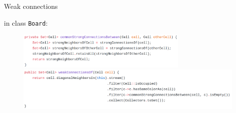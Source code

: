 \documentclass{beamer}
\begin{document}
\begin{frame}{Weak connections}

	in class \texttt{Board}:
\begin{figure}
	\includegraphics[width=0.74\textwidth]{images/board2.png}
	\includegraphics[width=1\textwidth]{images/board3.png}
\end{figure}

\end{frame}
\end{document}
